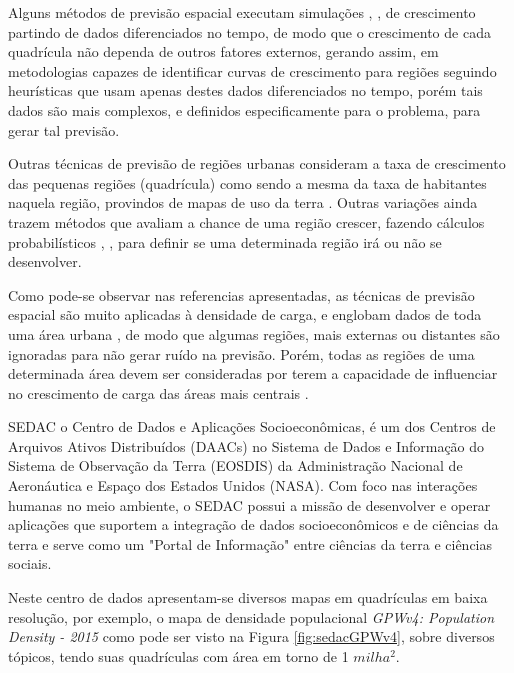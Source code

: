 Alguns métodos de previsão espacial executam simulações  \cite{arango1993mthesis}, \cite{arango2004spatial}, \cite{carreno2011cellular} de crescimento partindo de dados diferenciados no tempo, de modo que o crescimento de cada quadrícula não dependa de outros fatores externos, gerando assim, em metodologias capazes de identificar curvas de crescimento para regiões seguindo heurísticas que usam apenas destes dados diferenciados no tempo, porém tais dados são mais complexos, e definidos especificamente para o problema, para gerar tal previsão. 

Outras técnicas de previsão de regiões urbanas consideram a taxa de crescimento das pequenas regiões (quadrícula) como sendo a mesma da taxa de habitantes naquela região, provindos de mapas de uso da terra \cite{wu2002data}. Outras variações ainda trazem métodos que avaliam a chance de uma região crescer, fazendo cálculos probabilísticos \cite{melo2015spatial}, \cite{arango1993mthesis}, \cite{arango2004spatial} para definir se uma determinada região irá ou não se desenvolver.

Como pode-se observar nas referencias apresentadas, as técnicas de previsão espacial são muito aplicadas à densidade de carga, e englobam dados de toda uma área urbana  \cite{arango1993mthesis}, de modo que algumas regiões, mais externas ou distantes são ignoradas para não gerar ruído na previsão. Porém, todas as regiões de uma determinada área devem ser consideradas por terem a capacidade de influenciar no crescimento de carga das áreas mais centrais \cite{willis2002spatial}.

SEDAC  \cite{SEDAC2016} o Centro de Dados e Aplicações Socioeconômicas, é um dos Centros de Arquivos Ativos Distribuídos (DAACs) no Sistema de Dados e Informação do Sistema de Observação da Terra (EOSDIS) da Administração Nacional de Aeronáutica e Espaço dos Estados Unidos (NASA). Com foco nas interações humanas no meio ambiente, o SEDAC possui a missão de desenvolver e operar aplicações que suportem a integração de dados socioeconômicos e de ciências da terra e serve como um "Portal de Informação" entre ciências da terra e ciências sociais. 

Neste centro de dados apresentam-se diversos mapas em quadrículas em baixa resolução, por exemplo, o mapa de densidade populacional \emph{GPWv4: Population Density - 2015} \cite{SEDAC2016} como pode ser visto na Figura \ref{fig:sedacGPWv4}, sobre diversos tópicos, tendo suas quadrículas com área em torno de 1 \(milha^2\).

